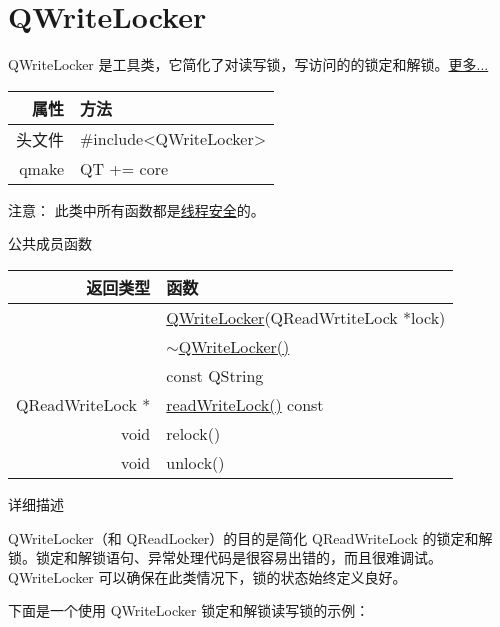 \chapter{QWriteLocker}

QWriteLocker 是工具类，它简化了对读写锁，写访问的的锁定和解锁。\href{https://github.com/QtDocumentCN/QtDocumentCN/blob/master/Src/W/QWriteLocker/QWriteLocker.md#%E8%AF%A6%E7%BB%86%E6%8F%8F%E8%BF%B0}{更多...}


\begin{tabular}{|r|l|}
	\hline
	属性 & 方法 \\
	\hline
	头文件 & \#include<QWriteLocker>\\      
	\hline
	qmake & QT += core\\      
	\hline
\end{tabular}

注意： 此类中所有函数都是\href{https://github.com/QtDocumentCN/QtDocumentCN/blob/master/Src/R/Reentrancy_and_Thread-Safety/Reentrancy_and_Thread-Safety.md}{线程安全}的。


公共成员函数

\begin{tabular}{|r|l|}
	\hline
	返回类型 & 函数 \\
	\hline
	&	\href{https://github.com/QtDocumentCN/QtDocumentCN/blob/master/Src/W/QWriteLocker/QWriteLocker.md#qwritelockerqwritelockerqreadwritelock-lock}{QWriteLocker}(QReadWrtiteLock *lock) \\
	\hline
	& \href{https://github.com/QtDocumentCN/QtDocumentCN/blob/master/Src/W/QWriteLocker/QWriteLocker.md#qwritelockerqwritelocker}{$\sim$QWriteLocker()} \\
	\hline
		&const QString\\
	\hline
	QReadWriteLock *	&\href{https://github.com/QtDocumentCN/QtDocumentCN/blob/master/Src/W/QWriteLocker/QWriteLocker.md#qreadwritelock-qwritelockerreadwritelock-const}{readWriteLock()}  const\\
	\hline
	void&	relock()\\
	\hline
	void &	unlock()\\
	\hline
\end{tabular}


详细描述


QWriteLocker（和 QReadLocker）的目的是简化 QReadWriteLock 的锁定和解锁。锁定和解锁语句、异常处理代码是很容易出错的，而且很难调试。QWriteLocker 可以确保在此类情况下，锁的状态始终定义良好。

下面是一个使用 QWriteLocker 锁定和解锁读写锁的示例：


